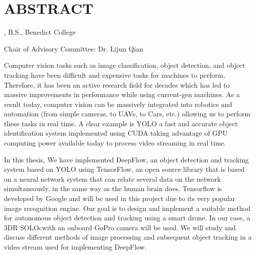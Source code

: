 %
%
%

\chapter*{ABSTRACT}

\thispagestyle{plain} %
\setcounter{page}{3}

\begin{center}
\pvamumanuscripttitle

\pvamugradmonth \hspace{2pt} \pvamugradyear

\pvamufullname, B.S., Benedict College

Chair of Advisory Committee: Dr. Lijun Qian

\par\end{center}

\indent Computer vision tasks such as image classification, object detection, and object tracking have been difficult and expensive tasks for machines to perform. Therefore, it has been an active research field for decades which has led to massive improvements in performance while using  current-gen machines. As a result today, computer vision can be massively integrated into robotics and automation (from simple cameras, to UAVs, to Cars, etc.) allowing us to perform these tasks in real time.  A clear example  is YOLO a fast and accurate object identification system implemented using CUDA taking advantage of GPU computing power available today to process video streaming in real time. 

In this thesis, We have implemented DeepFlow, an object detection and tracking system based on YOLO using TensorFlow, an open source library that is based on a neural network system that  can relate several data on the network simultaneously, in the same way as the human brain does. Tensorflow is developed by Google and will be used in this project due to its very popular image recognition engine.  Our goal is to design and implement a suitable method for autonomous object detection and tracking using a smart drone. In our case, a 3DR SOLOcwith an onboard GoPro camera will be used. We will study and discuss  different methods of image processing and subsequent object tracking in a video stream used for implementing DeepFlow.
 
\pagebreak{}
